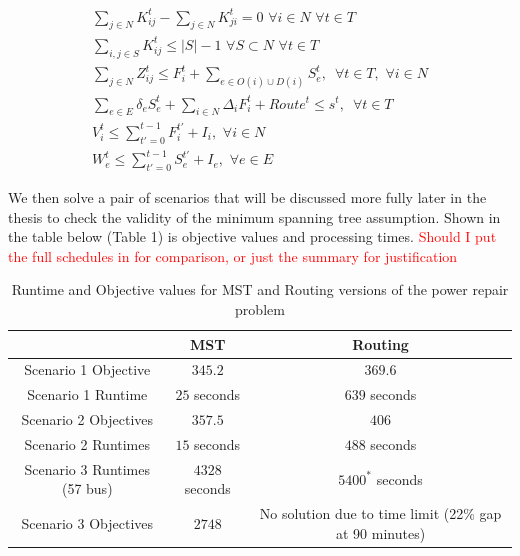 \documentclass{article}
\begin{document}
\begin{eqnarray}
	\sum_{j \in N} K_{ij}^t - \sum_{j \in N} K_{ji}^t = 0 \hspace{4pt} \forall i \in N \hspace{4pt} \forall t \in T\\
	\sum_{i,j \in S} K_{ij}^t \leq |S|-1 \hspace{4pt} \forall S \subset N \hspace{4pt} \forall t \in T\\
	\sum_{j \in N} Z_{ij}^t \leq F_i^t + \sum_{e \in O(i) \cup D(i)} S_{e}^t, \hspace{6pt} \forall t \in T, \hspace{4pt} \forall i \in N \\
	\sum_{e \in E} \delta_{e}S_e^t + \sum_{i \in N}\Delta_{i}F_i^t + Route^t \le s^t, \hspace{6pt} \forall t \in T\\
	V_i^t \leq \sum_{t'=0}^{t-1} F_i^{t'}+I_i, \hspace{4pt} \forall i \in N\\
	W_{e}^t \leq \sum_{t'=0}^{t-1} S_{e}^{t'}+I_e, \hspace{4pt} \forall e \in E
	\end{eqnarray}
	
	We then solve a pair of scenarios that will be discussed more fully later in the thesis to check the validity of the minimum spanning tree assumption. Shown in the table below (Table 1) is objective values and processing times. \textcolor{red}{Should I put the full schedules in for comparison, or just the summary for justification }
 \begin{table}[htbp]
	\centering
	\begin{tabular}{|c|c|c|}
		\cline{2-3}
		\multicolumn{1}{c|}{} & MST  & Routing \\
		\hline
		Scenario 1 Objective                & $345.2$   & $369.6$   \\
		\hline
		Scenario 1 Runtime                & $25$ seconds   & $639$ seconds \\
		\hline
		Scenario 2 Objectives               & $357.5$   & $406$  \\
		\hline
		Scenario 2 Runtimes              & $15$ seconds   & $488$ seconds \\
		\hline
		Scenario 3 Runtimes (57 bus) & $4328$ seconds & $5400^*$ seconds\\
		\hline
		Scenario 3 Objectives	& $2748$ & No solution due to time limit (22\% gap at 90 minutes)\\
		\hline
	\end{tabular}
	\caption{Runtime and Objective values for MST and Routing versions of the power repair problem}
	\label{time}
\end{table}
\end{document}
